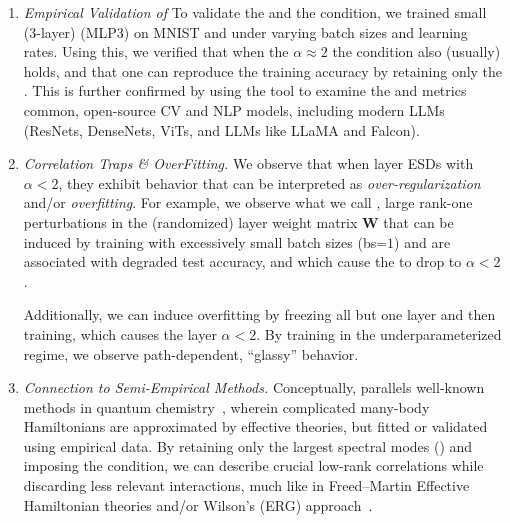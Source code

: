 \begin{enumerate}[label=\Alph*.]
\item 
  \emph{Empirical Validation of \SETOL}
To validate the \ECS and the \TRACELOG condition, we trained small (3-layer) \MultiLayerPerceptron (MLP3)
on MNIST and under varying batch sizes and learning rates.  Using this, we verified that
when the \HTSR $\alpha\approx 2$ the \SETOL \TRACELOG condition also (usually) holds,
and that one can reproduce the training accuracy by retaining only the \ECS.
This is further confirmed by using the \WW tool to examine the \ALPHA and \DETX metrics
common, open-source CV and NLP  models, including modern LLMs 
(ResNets, DenseNets,    ViTs, and LLMs like LLaMA and Falcon).

\item
  \emph{ Correlation Traps \& OverFitting.}
  We  observe that when layer ESDs with $\alpha<2$, they exhibit behavior that can be interpreted as
  \emph{over-regularization} and/or  \emph{overfitting}.
  For example, we observe what we call \emph{\CorrelationTraps}, large rank-one perturbations in the
  (randomized)  layer weight matrix $\mathbf{W}$ that can be induced by training with
  excessively small batch sizes (bs=$1$) and are associated with degraded test accuracy,
  and which cause the \HTSR to drop to $\alpha<2$.
  
  Additionally, we can induce overfitting by freezing all but one layer and
  then training, which causes the layer $\alpha<2$.  By training in
  the underparameterized regime, we observe path-dependent, “glassy” behavior.

\item 
\emph{Connection to Semi-Empirical Methods.}
Conceptually, \SETOL parallels well-known \emph{\SemiEmpirical} methods in quantum
chemistry~\cite{Martin1996, Martin1996_CPL,Martin1998}, wherein complicated many-body Hamiltonians are approximated by 
effective theories, but fitted or validated using empirical data. By retaining only the largest spectral modes 
(\ECS) and imposing the \TRACELOG condition, we can describe crucial low-rank correlations while discarding less 
relevant interactions, much like in Freed--Martin Effective Hamiltonian theories and/or Wilson’s  \ExactRenormalizationGroup 
(ERG) approach~\cite{PhysRevLett.69.800}.
\end{enumerate}

